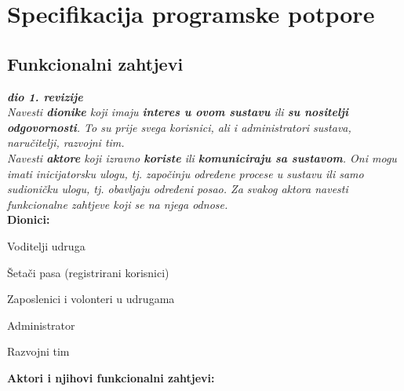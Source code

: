 \chapter{Specifikacija programske potpore}
		
	\section{Funkcionalni zahtjevi}
			
			\textbf{\textit{dio 1. revizije}}\\
			
			\textit{Navesti \textbf{dionike} koji imaju \textbf{interes u ovom sustavu} ili  \textbf{su nositelji odgovornosti}. To su prije svega korisnici, ali i administratori sustava, naručitelji, razvojni tim.}\\
				
			\textit{Navesti \textbf{aktore} koji izravno \textbf{koriste} ili \textbf{komuniciraju sa sustavom}. Oni mogu imati inicijatorsku ulogu, tj. započinju određene procese u sustavu ili samo sudioničku ulogu, tj. obavljaju određeni posao. Za svakog aktora navesti funkcionalne zahtjeve koji se na njega odnose.}\\
			
			
			\noindent \textbf{Dionici:}
			
			\begin{packed_enum}
				
				\item Voditelji udruga
				\item Šetači pasa (registrirani korisnici)			
				\item Zaposlenici i volonteri u udrugama
				\item Administrator
				\item Razvojni tim
				
			\end{packed_enum}
			\vspace{5mm}
			
			\noindent \textbf{Aktori i njihovi funkcionalni zahtjevi:}
			
